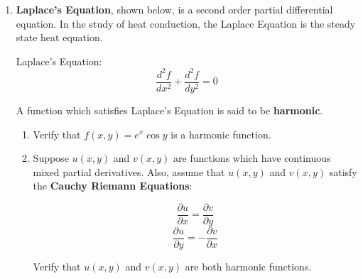 \documentclass[12pt]{article}
\newif\ifans
\begin{document}
\begin{enumerate}
\item {\bf Laplace's Equation}, shown below, is a second order partial differential equation.  In the study of heat conduction, the Laplace Equation is the steady state heat equation.
\begin{center}
Laplace's Equation:
$$\frac{d^2f}{dx^2}+\frac{d^2f}{dy^2}=0$$
\end{center}

A function which satisfies Laplace's Equation is said to be {\bf harmonic}.

\begin{enumerate}

\item Verify that $f(x,y)=e^x\cos{y}$ is a harmonic function.

\ifans{\fbox{\parbox{1\linewidth}{You can verify by direct computation that $f_{xx}(x,y)=e^x\cos{y}$ and $f_{yy}(x,y)=-e^x\cos{y}$.  Then, $f_{xx}(x,y)+f_{yy}(x,y)=e^x\cos{y}+\left(-e^x\cos{y}\right)=0$.  Thus, since $f(x,y)$ satisfies Laplace's Equation, it is a harmonic function.}}} \fi

\item Suppose $u(x,y)$ and $v(x,y)$ are functions which have continuous mixed partial derivatives.  Also, assume that $u(x,y)$ and $v(x,y)$ satisfy the {\bf Cauchy Riemann Equations}:

$$\frac{\partial u}{\partial x}=\frac{\partial v}{\partial y}$$
$$\frac{\partial u}{\partial y}=-\frac{\partial v}{\partial x}$$

Verify that $u(x,y)$ and $v(x,y)$ are both harmonic functions.

\ifans{\fbox{\parbox{1\linewidth}{We begin by showing that $u(x,y)$ is a harmonic function.  To do so, we differentiate the first of the Riemann Equations with respect to $x$ which yields $\frac{\partial^2 u}{\partial x \partial x}=\frac{\partial^2 v}{\partial x\partial y}$.  And, we differentiate the second of the Cauch-Riemann Equations with respect to $y$ which yields $\frac{\partial^2 u}{\partial y \partial y}=-\frac{\partial^2 v}{\partial y \partial x}$.  Then,
\begin{align*}
\frac{d^2u}{dx^2}+\frac{d^2u}{dy^2} & = \frac{\partial^2 v}{\partial x\partial y}+\left(-\frac{\partial^2 v}{\partial y \partial x}\right)\\
&=\frac{\partial^2 v}{\partial x\partial y}-\frac{\partial^2 v}{\partial x\partial y}\\
&\text{by symmetry of mixed partial derivatives}\\
&=0
\end{align*}
So, since $u(x,y)$ satisfies Laplace's Equation, it is a harmonic function.  A similar argument holds for $v(x,y)$.}}} \fi



\end{enumerate}
\end{enumerate}
\end{document}
